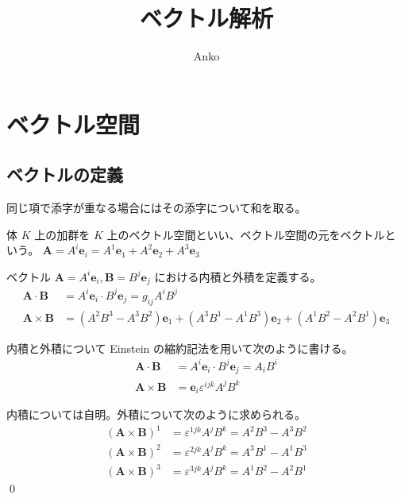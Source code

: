 \documentclass[uplatex,dvipdfmx,a4paper,11pt]{jlreq}
\title{ベクトル解析}
\author{Anko}
\makeatletter
\renewcommand{\AA}{\bm{A}}
\newcommand{\BB}{\bm{B}}
\newcommand{\ee}{\bm{e}}
\theoremstyle{definition}
\renewenvironment{proof}[1][\proofname]{\par
  \normalfont
  \topsep6\p@\@plus6\p@ \trivlist
  \item[\hskip\labelsep{\bfseries #1}\@addpunct{\bfseries}]\ignorespaces\quad\par
}{%
  \qed\endtrivlist\@endpefalse
}
\renewcommand\proofname{証明}
\makeatother
\begin{document}
\maketitle
\tableofcontents
\clearpage

\section{ベクトル空間}
\subsection{ベクトルの定義}
\begin{definition}
  同じ項で添字が重なる場合にはその添字について和を取る。
\end{definition}

\begin{definition}[ベクトル空間]
  体 $K$ 上の加群を $K$ 上のベクトル空間といい、ベクトル空間の元をベクトルという。
  $\AA = A^i\ee_i = A^1\ee_1 + A^2\ee_2 + A^3\ee_3$
\end{definition}

\begin{definition}[ベクトル空間における内積と外積]
  ベクトル $\AA = A^i\ee_i, \BB = B^j\ee_j$ における内積と外積を定義する。
  \begin{align}
    \AA\cdot\BB  & = A^i\ee_i\cdot B^j\ee_j = g_{ij}A^iB^j                                    \\
    \AA\times\BB & = (A^2B^3 - A^3B^2)\ee_1 + (A^3B^1 - A^1B^3)\ee_2 + (A^1B^2 - A^2B^1)\ee_3
  \end{align}
\end{definition}

\begin{theorem}
  内積と外積について Einstein の縮約記法を用いて次のように書ける。
  \begin{align}
    \AA\cdot\BB  & = A^i\ee_i\cdot B^j\ee_j = A_iB^i \\
    \AA\times\BB & = \bm{e}_i\varepsilon^{ijk}A^jB^k
  \end{align}
\end{theorem}
\begin{proof}
  内積については自明。外積について次のように求められる。
  \begin{align}
    (\AA\times\BB)^1 & = \varepsilon^{1jk}A^jB^k = A^2B^3 - A^3B^2 \\
    (\AA\times\BB)^2 & = \varepsilon^{2jk}A^jB^k = A^3B^1 - A^1B^3 \\
    (\AA\times\BB)^3 & = \varepsilon^{3jk}A^jB^k = A^1B^2 - A^2B^1
  \end{align}
\end{proof}
\end{document}
